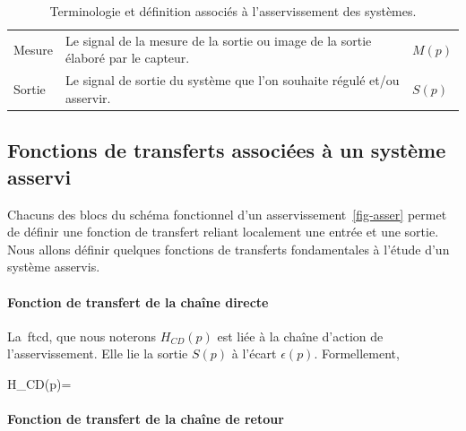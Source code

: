 \begin{table}[!h]
\begin{tabular}{@{}P{3cm}m{8.5cm}P{3cm}@{}}
Mesure          & Le signal de la mesure de la sortie ou image de la sortie
                  élaboré par le capteur.
                & $M(p)$                                                \\
Sortie          & Le signal de sortie du système que l'on souhaite 
                  régulé et/ou asservir.
                & $S(p)$                                                \\
        \bottomrule
    \end{tabular}
\caption{Terminologie et définition associés à l'asservissement des 
         systèmes.\label{tab-asser}}
\end{table}

\clearpage

\subsection{Fonctions de transferts associées à un système asservi}

Chacuns des blocs du schéma fonctionnel d'un asservissement~\cref{fig-asser} 
permet de définir une fonction de transfert reliant localement une entrée 
et une sortie.
Nous allons définir quelques fonctions de transferts fondamentales à 
l'étude d'un système asservis.

\paragraph{Fonction de transfert de la chaîne directe}

La~\gls{ftcd}, que nous noterons $H_{CD}(p)$ est liée à 
la chaîne d'action de l'asservissement. Elle lie la sortie $S(p)$ à 
l'écart $\epsilon(p)$. Formellement,
\begin{bequation}
H_{CD}(p)=
\end{bequation}

\paragraph{Fonction de transfert de la chaîne de retour}

